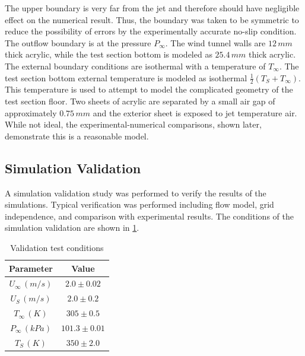 \documentclass[preprint,12pt]{elsarticle}
\begin{document}
The upper boundary is very far from the jet and therefore should have negligible effect on the numerical result.  Thus, the boundary was taken to be symmetric to reduce the possibility of errors by the experimentally accurate no-slip condition.  The outflow boundary is at the pressure $P_{\infty}$.  The wind tunnel walls are $12\, mm$ thick acrylic, while the test section bottom is modeled as $25.4\,mm$ thick acrylic.  The external boundary conditions are isothermal with a temperature of $T_{\infty}$.  The test section bottom external temperature is modeled as isothermal $\frac{1}{2}\left(T_S+T_{\infty}\right)$.  This temperature is used to attempt to model the complicated geometry of the test section floor.  Two sheets of acrylic are separated by a small air gap of approximately $0.75\,mm$ and the exterior sheet is exposed to jet temperature air.  While not ideal, the experimental-numerical comparisons, shown later, demonstrate this is a reasonable model.

\subsection{Simulation Validation}
A simulation validation study was performed to verify the results of the simulations.  Typical verification was performed including flow model, grid independence, and comparison with experimental results.  The conditions of the simulation validation are shown in \cref{tab:VTjet}.

\begin{table}[!t!b!p]
\begin{center}
\begin{tabular}{ c c }
\hline
Parameter    & Value \\ \hline
$U_{\infty} \, (m/s)$ & $2.0\pm0.02$ \\
$U_S \, (m/s)$ & $2.0\pm0.2$ \\
$T_{\infty} \, (K) $ & $305\pm0.5$ \\
$P_{\infty} \, (kPa) $ & $101.3\pm0.01$ \\
$T_{S} \, (K) $ & $350\pm2.0$ \\ \hline
\end{tabular}
\caption{Validation test conditions}
\label{tab:VTjet}
\end{center}
\end{table}
\end{document}

